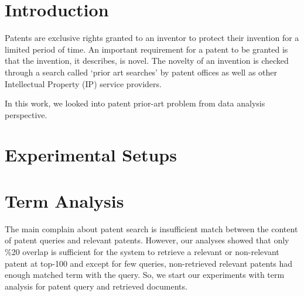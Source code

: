 \documentclass{sig-alternate}
\begin{document}
\date{30 July 1999}

\maketitle
\begin{abstract}

\end{abstract}




\section{Introduction}
Patents are exclusive rights granted to an inventor to protect their invention for a limited period of time. An important requirement for a patent to be granted is that the invention, it describes, is novel. The novelty of an invention is checked through a search called `prior art searches' by patent offices as well as other Intellectual Property (IP) service providers. 

In this work, we looked into patent prior-art problem from data analysis perspective.
\section{Experimental Setups}

\section{Term Analysis}
The main complain about patent search is insufficient match between the content of patent queries and relevant
patents\cite{magdy2012toward, mahdabi2013leveraging}. However, our analyses showed that only \%20 overlap is sufficient for the system to retrieve a relevant or non-relevant patent at top-100 and except for few queries, non-retrieved relevant patents had enough matched term with the query. So, we start our experiments with term analysis for patent query and retrieved documents. 
\end{document}
